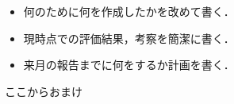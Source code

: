 \label{MUSUBI}
\begin{itemize}
	\item 何のために何を作成したかを改めて書く．
	\item 現時点での評価結果，考察を簡潔に書く．
	\item 来月の報告までに何をするか計画を書く．
\end{itemize}
\newpage

ここからおまけ




 
